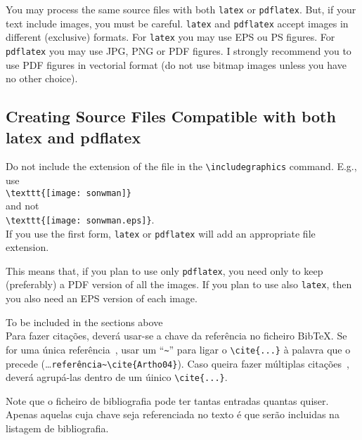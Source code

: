 You may process the same source files with both \verb!latex! or \verb!pdflatex!. But, if your text include images, you must be careful. \verb!latex! and \verb!pdflatex! accept images in different (exclusive) formats.  For \verb!latex! you may use EPS ou PS figures. For \verb!pdflatex! you may use JPG, PNG or PDF figures.  I strongly recommend you to use PDF figures in vectorial format (do not use bitmap images unless you have no other choice).


\subsection{Creating Source Files Compatible with both latex and pdflatex} %
\label{ssec:creating_source_files_compatible_with_both_latex_and_pdflatex}

Do not include the extension of the file in the \verb!\includegraphics! command. E.g., use\\
\verb!\texttt{[image: sonwman]}!\\
and not\\
\verb!\texttt{[image: sonwman.eps]}!.\\
If you use the first form, \verb!latex! or \verb!pdflatex! will add an appropriate file extension.

This means that, if you plan to use only \verb!pdflatex!, you need only to keep (preferably) a PDF version of all the images. If you plan to use also \verb!latex!, then you also need an EPS version of each image.



\newpage

{\Large To be included in the sections above}\\

Para fazer citações, deverá usar-se a chave da referência no ficheiro BibTeX. Se for uma única referência~\cite{Artho04}, usar um ``\verb!~!'' para ligar o \verb!\cite{...}! à palavra que o precede (\ldots\verb!referência~\cite{Artho04}!).  Caso queira fazer múltiplas citações~\cite{Shavit95,Silberschatz06,Moss85}, deverá agrupá-las dentro de um úinico \verb!\cite{...}!.

Note que o ficheiro de bibliografia pode ter tantas entradas quantas quiser. Apenas aquelas cuja chave seja referenciada no texto é que serão incluidas na listagem de bibliografia.


